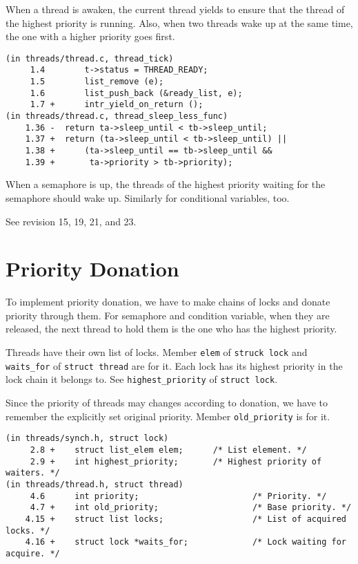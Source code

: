 \documentclass[a4paper,article,11pt,oneside]{article}
\begin{document}
When a thread is awaken, the current thread yields to ensure that the
thread of the highest priority is running. Also, when two threads wake
up at the same time, the one with a higher priority goes first.
\begin{verbatim}
(in threads/thread.c, thread_tick)
     1.4        t->status = THREAD_READY;
     1.5        list_remove (e);
     1.6        list_push_back (&ready_list, e);
     1.7 +      intr_yield_on_return ();
(in threads/thread.c, thread_sleep_less_func)
    1.36 -  return ta->sleep_until < tb->sleep_until;
    1.37 +  return (ta->sleep_until < tb->sleep_until) ||
    1.38 +      (ta->sleep_until == tb->sleep_until &&
    1.39 +       ta->priority > tb->priority);
\end{verbatim}

When a semaphore is up, the threads of the highest priority waiting
for the semaphore should wake up. Similarly for conditional variables,
too.

See revision 15, 19, 21, and 23.

\section{Priority Donation}\label{secdonate}

To implement priority donation, we have to make chains of locks and
donate priority through them. For semaphore and condition variable,
when they are released, the next thread to hold them is the one who
has the highest priority.

Threads have their own list of locks. Member \texttt{elem} of
\texttt{struck lock} and \texttt{waits\_for} of \texttt{struct thread}
are for it. Each lock has its highest priority in the lock chain it
belongs to. See \texttt{highest\_priority} of \texttt{struct lock}.

Since the priority of threads may changes according to donation, we
have to remember the explicitly set original priority. Member
\texttt{old\_priority} is for it.

\begin{verbatim}
(in threads/synch.h, struct lock)
     2.8 +    struct list_elem elem;      /* List element. */
     2.9 +    int highest_priority;       /* Highest priority of waiters. */
(in threads/thread.h, struct thread)
     4.6      int priority;                       /* Priority. */
     4.7 +    int old_priority;                   /* Base priority. */
    4.15 +    struct list locks;                  /* List of acquired locks. */
    4.16 +    struct lock *waits_for;             /* Lock waiting for acquire. */
\end{verbatim}
\end{document}
